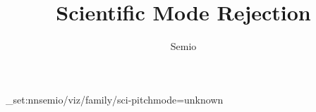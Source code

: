 \documentclass[type=paper,language=en,theme=light]{semio}
\title{Scientific Mode Rejection}
\author{Semio}
\date{}
\begin{document}
\SemioVizProbePage
\ExplSyntaxOn\keys_set:nn{semio/viz/family/sci-pitch}{mode=unknown}\ExplSyntaxOff
{}
\SemioVizProbeEnd
\end{document}
